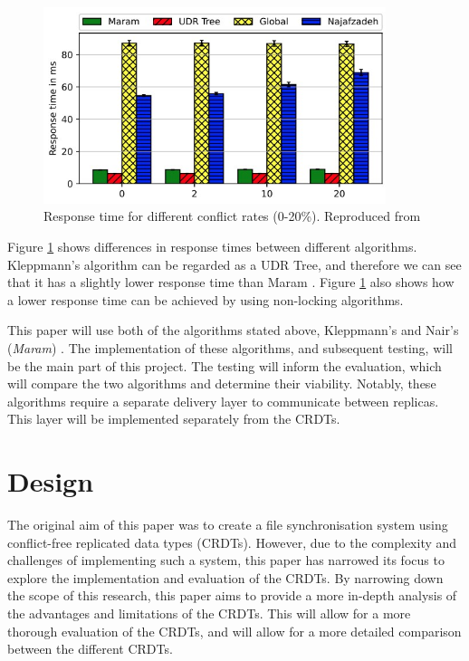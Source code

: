 \documentclass[12pt]{article}
\begin{document}
\begin{figure}[H]
    \centering
    \includegraphics[width=10cm]{Response.jpg}
    \caption{Response time for different conflict rates (0-20\%). Reproduced from \cite{https://doi.org/10.48550/arxiv.2103.04828}}
    \label{fig:responsetime}
\end{figure}

Figure \ref{fig:responsetime} shows differences in response times between different algorithms. Kleppmann's algorithm \cite{9563274} can be regarded as a UDR Tree, and therefore we can see that it has a slightly lower response time than Maram \cite{https://doi.org/10.48550/arxiv.2103.04828}. Figure \ref{fig:responsetime} also shows how a lower response time can be achieved by using non-locking algorithms.


This paper will use both of the algorithms stated above, Kleppmann's \cite{9563274} and Nair's (\textit{Maram}) \cite{https://doi.org/10.48550/arxiv.2103.04828}. The implementation of these algorithms, and subsequent testing, will be the main part of this project. The testing will inform the evaluation, which will compare the two algorithms and determine their viability. Notably, these algorithms require a separate delivery layer to communicate between replicas. This layer will be implemented separately from the CRDTs.


\newpage
\section{Design}
The original aim of this paper was to create a file synchronisation system using conflict-free replicated data types (CRDTs). However, due to the complexity and challenges of implementing such a system, this paper has narrowed its focus to explore the implementation and evaluation of the CRDTs. By narrowing down the scope of this research, this paper aims to provide a more in-depth analysis of the advantages and limitations of the CRDTs. This will allow for a more thorough evaluation of the CRDTs, and will allow for a more detailed comparison between the different CRDTs.
\end{document}
